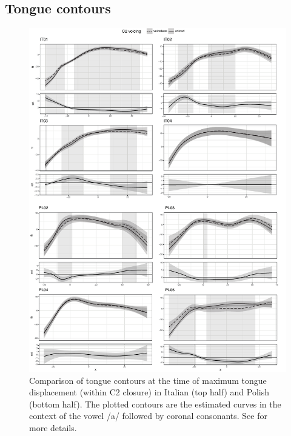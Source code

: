 \documentclass[authoryear, twocolumn]{elsarticle}
\begin{document}
\subsection{Tongue contours}\label{tongue-contours}

\label{s:splines}

\begin{figure}
    \centering
    \includegraphics[height=.9\textheight]{fig/tra.pdf}
    \caption{Comparison of tongue contours at the time of maximum tongue displacement (within C2 closure) in Italian (top half) and Polish (bottom half). The plotted contours are the estimated curves in the context of the vowel /a/ followed by coronal consonants. See  for more details.}
    \label{f:tra}
\end{figure}
\end{document}

